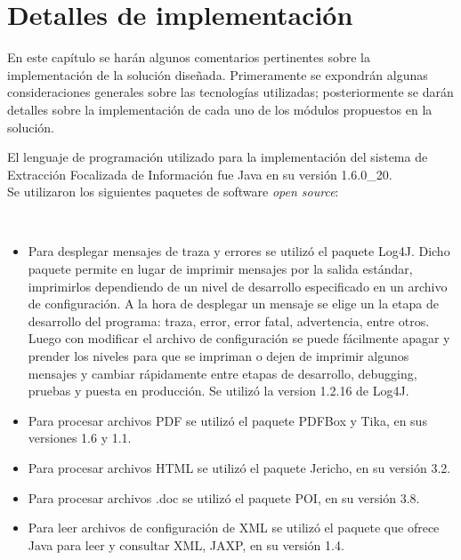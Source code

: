\chapter{Detalles de implementación} \label{chap:implementacion}

En este capítulo se harán algunos comentarios pertinentes sobre la implementación de la solución diseñada. Primeramente se expondrán algunas consideraciones generales sobre las tecnologías utilizadas; posteriormente se darán detalles sobre la implementación de cada uno de los módulos propuestos en la solución. 

El lenguaje de programación utilizado para la implementación del sistema de Extracción Focalizada de Información fue Java en su versión 1.6.0\_20. \\

Se utilizaron los siguientes paquetes de software \emph{open source}: 

\\

\begin{itemize}
\item Para desplegar mensajes de traza y errores se utilizó el paquete Log4J. Dicho paquete permite en lugar de imprimir mensajes por la salida estándar, imprimirlos dependiendo de un nivel de desarrollo especificado en un archivo de configuración. A la hora de desplegar un mensaje se elige un la etapa de desarrollo del programa: traza, error, error fatal, advertencia, entre otros. Luego con modificar el archivo de configuración se puede fácilmente apagar y prender los niveles para que se impriman o dejen de imprimir algunos mensajes y cambiar rápidamente entre etapas de desarrollo, debugging, pruebas y puesta en producción. Se utilizó la version 1.2.16 de Log4J.

\item Para procesar archivos PDF se utilizó el paquete PDFBox y Tika, en sus versiones 1.6 y 1.1.
\item Para procesar archivos HTML se utilizó el paquete Jericho, en su versión 3.2.
\item Para procesar archivos .doc se utilizó el paquete POI, en su versión 3.8.
\item Para leer archivos de configuración de XML se utilizó el paquete que ofrece Java para leer y consultar XML, JAXP, en su versión 1.4.

\end{itemize}

